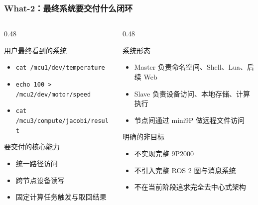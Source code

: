 \documentclass[aspectratio=169]{ctexbeamer}
\begin{document}
\begin{frame}
  \frametitle{What-2：最终系统要交付什么闭环}
  \begin{columns}[T]
    \begin{column}{0.48\textwidth}
      \begin{block}{用户最终看到的系统}
        \small
        \begin{itemize}
          \item \texttt{cat /mcu1/dev/temperature}
          \item \texttt{echo 100 > /mcu2/dev/motor/speed}
          \item \texttt{cat /mcu3/compute/jacobi/result}
        \end{itemize}
      \end{block}
      \begin{block}{要交付的核心能力}
        \small
        \begin{itemize}
          \item 统一路径访问
          \item 跨节点设备读写
          \item 固定计算任务触发与取回结果
        \end{itemize}
      \end{block}
    \end{column}
    \begin{column}{0.48\textwidth}
      \begin{block}{系统形态}
        \small
        \begin{itemize}
          \item Master 负责命名空间、Shell、Lua、后续 Web
          \item Slave 负责设备访问、本地存储、计算执行
          \item 节点间通过 mini9P 做远程文件访问
        \end{itemize}
      \end{block}
      \begin{alertblock}{明确的非目标}
        \small
        \begin{itemize}
          \item 不实现完整 9P2000
          \item 不引入完整 ROS 2 图与消息系统
          \item 不在当前阶段追求完全去中心式架构
        \end{itemize}
      \end{alertblock}
    \end{column}
  \end{columns}
\end{frame}
\end{document}

